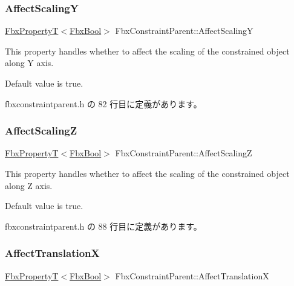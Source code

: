 \subsubsection{\texorpdfstring{Affect\+ScalingY}{AffectScalingY}}
{\footnotesize\ttfamily \hyperlink{class_fbx_property_t}{Fbx\+PropertyT}$<$\hyperlink{fbxtypes_8h_a92e0562b2fe33e76a242f498b362262e}{Fbx\+Bool}$>$ Fbx\+Constraint\+Parent\+::\+Affect\+ScalingY}

This property handles whether to affect the scaling of the constrained object along Y axis.

Default value is true. 

 fbxconstraintparent.\+h の 82 行目に定義があります。

\mbox{\label{class_fbx_constraint_parent_abbbb60d845ab61bede0b28f5a7defa22}} 
\subsubsection{\texorpdfstring{Affect\+ScalingZ}{AffectScalingZ}}
{\footnotesize\ttfamily \hyperlink{class_fbx_property_t}{Fbx\+PropertyT}$<$\hyperlink{fbxtypes_8h_a92e0562b2fe33e76a242f498b362262e}{Fbx\+Bool}$>$ Fbx\+Constraint\+Parent\+::\+Affect\+ScalingZ}

This property handles whether to affect the scaling of the constrained object along Z axis.

Default value is true. 

 fbxconstraintparent.\+h の 88 行目に定義があります。

\mbox{\label{class_fbx_constraint_parent_ac67f39b8f34fce85fdfba40823d243fe}} 
\subsubsection{\texorpdfstring{Affect\+TranslationX}{AffectTranslationX}}
{\footnotesize\ttfamily \hyperlink{class_fbx_property_t}{Fbx\+PropertyT}$<$\hyperlink{fbxtypes_8h_a92e0562b2fe33e76a242f498b362262e}{Fbx\+Bool}$>$ Fbx\+Constraint\+Parent\+::\+Affect\+TranslationX}

